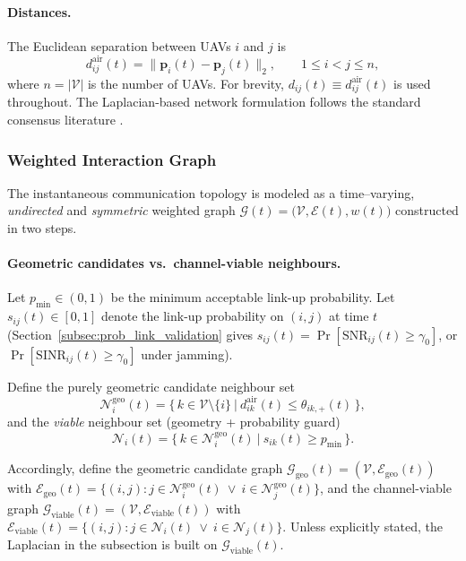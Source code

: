 \documentclass[preprint,12pt]{elsarticle}
\theoremstyle{definition}\newtheorem{definition}{Definition}
\theoremstyle{plain}\newtheorem{theorem}{Theorem}
\theoremstyle{plain}\newtheorem{lemma}{Lemma}
\theoremstyle{plain}\newtheorem{corollary}{Corollary}
\theoremstyle{plain}\newtheorem{assumption}{Assumption}
\theoremstyle{remark}\newtheorem{remark}[theorem]{Remark}
\begin{document}
\paragraph{Distances.}
The Euclidean separation between UAVs $i$ and $j$ is
\begin{equation}
  d^{\text{air}}_{ij}(t)=\|\boldsymbol p_i(t)-\boldsymbol p_j(t)\|_2,
  \qquad 1\le i<j\le n,
  \label{eq:distance_ij}
\end{equation}
where $n=|\mathcal V|$ is the number of UAVs. For brevity, $d_{ij}(t)\equiv d^{\text{air}}_{ij}(t)$ is used throughout.
The Laplacian-based network formulation follows the standard consensus literature \cite{olfati2007consensus}.


\subsubsection{Weighted Interaction Graph}
\label{subsubsec:weighted_graph}

The instantaneous communication topology is modeled as a time--varying, \emph{undirected} and \emph{symmetric} weighted graph
\(
  \mathcal G(t)=\bigl(\mathcal V,\mathcal E(t),w(t)\bigr)
\)
constructed in two steps.

\paragraph{Geometric candidates vs.\ channel-viable neighbours.}
Let $p_{\min}\in(0,1)$ be the minimum acceptable link-up probability.
Let $s_{ij}(t)\in[0,1]$ denote the link-up probability on $(i,j)$ at time $t$
(Section~\ref{subsec:prob_link_validation} gives $s_{ij}(t)=\Pr[\mathrm{SNR}_{ij}(t)\ge\gamma_0]$,
or $\Pr[\mathrm{SINR}_{ij}(t)\ge\gamma_0]$ under jamming).

Define the purely geometric candidate neighbour set
\[
  \mathcal N_i^{\mathrm{geo}}(t)
  = \bigl\{\,k \in \mathcal V\setminus\{i\}\ \big|\ d^{\text{air}}_{ik}(t)\le \theta_{ik,+}(t)\,\bigr\},
\]
and the \emph{viable} neighbour set (geometry + probability guard)
\[
  \mathcal N_i(t)
  = \bigl\{\,k \in \mathcal N_i^{\mathrm{geo}}(t)\ \big|\ s_{ik}(t)\ge p_{\min}\,\bigr\}.
\]

Accordingly, define the geometric candidate graph
$\mathcal G_{\mathrm{geo}}(t)=(\mathcal V,\mathcal E_{\mathrm{geo}}(t))$ with
$\mathcal E_{\mathrm{geo}}(t)=\{(i,j): j\in\mathcal N_i^{\mathrm{geo}}(t)\ \lor\ i\in\mathcal N_j^{\mathrm{geo}}(t)\}$,
and the channel-viable graph
$\mathcal G_{\mathrm{viable}}(t)=(\mathcal V,\mathcal E_{\mathrm{viable}}(t))$ with
$\mathcal E_{\mathrm{viable}}(t)=\{(i,j): j\in\mathcal N_i(t)\ \lor\ i\in\mathcal N_j(t)\}$.
Unless explicitly stated, the Laplacian in the subsection is built on $\mathcal G_{\mathrm{viable}}(t)$.
\end{document}

